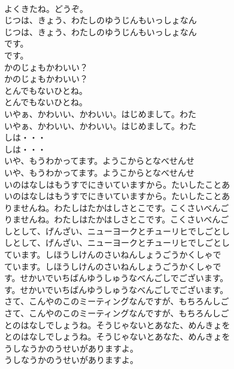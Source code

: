 \documentclass[8pt]{extreport}
\begin{document}
\begin{CJK}{UTF8}{min}
\\	よくきたね。どうぞ。 
\\	じつは、きょう、わたしのゆうじんもいっしょなん	
\\	じつは、きょう、わたしのゆうじんもいっしょなん 
\\	です。	
\\	です。 
\\	かのじょもかわいい？	
\\	かのじょもかわいい？ 
\\	とんでもないひとね。	
\\	とんでもないひとね。 
\\	いやぁ、かわいい、かわいい。はじめまして。わた	
\\	いやぁ、かわいい、かわいい。はじめまして。わた 
\\	しは・・・	
\\	しは・・・ 
\\	いや、もうわかってます。ようこからとなべせんせ	
\\	いや、もうわかってます。ようこからとなべせんせ 
\\	いのはなしはもうすでにきいていますから。たいしたことあ	
\\	いのはなしはもうすでにきいていますから。たいしたことあ 
\\	りませんね。わたしはたかはしさとこです。こくさいべんご	
\\	りませんね。わたしはたかはしさとこです。こくさいべんご 
\\	しとして、げんざい、ニューヨークとチューリヒでしごとし	
\\	しとして、げんざい、ニューヨークとチューリヒでしごとし 
\\	ています。しほうしけんのさいねんしょうごうかくしゃで	
\\	ています。しほうしけんのさいねんしょうごうかくしゃで 
\\	す。せかいでいちばんゆうしゅうなべんごしでございます。	
\\	す。せかいでいちばんゆうしゅうなべんごしでございます。 
\\	さて、こんやのこのミーティングなんですが、もちろんしご	
\\	さて、こんやのこのミーティングなんですが、もちろんしご 
\\	とのはなしでしょうね。そうじゃないとあなた、めんきょを	
\\	とのはなしでしょうね。そうじゃないとあなた、めんきょを 
\\	うしなうかのうせいがありますよ。	
\\	うしなうかのうせいがありますよ。 

\end{CJK}
\end{document}
